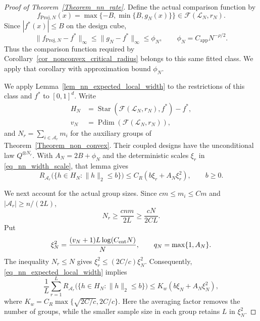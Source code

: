 \documentclass[twoside,11pt]{article}
\newenvironment{revision}{\color{revisionred}}{}
\begin{document}
\begin{revision}
\begin{proof}[Proof of Theorem~\ref{Theorem_nn_rate}]
Define the actual comparison function by
\[
f_{\mathrm{Proj},N}(x)
=\max\{-B,\min\{B,g_N(x)\}\}
\in\mathcal F(\mathcal L_N,r_N).
\]
Since $|f^*(x)|\leq B$ on the design cube,
\[
\|f_{\mathrm{Proj},N}-f^*\|_\infty
\leq\|g_N-f^*\|_\infty
\leq\phi_N,\qquad
\phi_N=C_{\mathrm{app}}N^{-\rho/2}.
\]
Thus the comparison function required by
Corollary~\ref{cor_nonconvex_critical_radius} belongs to this
same fitted class. We apply that corollary with approximation
bound $\phi_N$.

We apply Lemma~\ref{lem_nn_expected_local_width} to the
restrictions of this class and $f^*$ to $[0,1]^d$.
Write
\[
\begin{aligned}
H_N&=\operatorname{Star}(\mathcal F(\mathcal L_N,r_N),f^*)-f^*,\\
v_N&=\operatorname{Pdim}(\mathcal F(\mathcal L_N,r_N)),
\end{aligned}
\]
and $N_r=\sum_{i\in\mathcal A_r}m_i$ for the auxiliary groups
of Theorem~\ref{Theorem_non_convex}.
Their coupled designs have the unconditional law
$Q^{\otimes N_r}$. With $A_N=2B+\phi_N$ and the deterministic
scales $\xi_r$ in \eqref{eq_nn_width_scale}, that lemma gives
\[
R_{\mathcal A_r}\bigl(\{h\in H_N:\|h\|_2\leq b\}\bigr)
\leq C_R(b\xi_r+A_N\xi_r^2),\qquad b\geq0.
\]

We next account for the actual group sizes. Since
$cm\leq m_i\leq Cm$ and
$|\mathcal A_r|\geq n/(2L)$,
\[
N_r\geq\frac{cnm}{2L}\geq\frac{cN}{2CL}.
\]
Put
\[
\xi_N^2=\frac{(v_N+1)L\log(C_{\rm ent}N)}{N},
\qquad
q_N=\max\{1,A_N\}.
\]
The inequality $N_r\leq N$ gives
$\xi_r^2\leq(2C/c)\xi_N^2$.
Consequently, \eqref{eq_nn_expected_local_width} implies
\begin{equation}
\label{eq_nn_average_width}
\frac1L\sum_{r=1}^L
R_{\mathcal A_r}\bigl(\{h\in H_N:\|h\|_2\leq b\}\bigr)
\leq K_w(b\xi_N+A_N\xi_N^2),
\end{equation}
where
$K_w=C_R\max\{\sqrt{2C/c},2C/c\}$.
Here the averaging factor removes the number of groups, while
the smaller sample size in each group retains $L$ in $\xi_N^2$.


\end{proof}
\end{revision}
\end{document}
